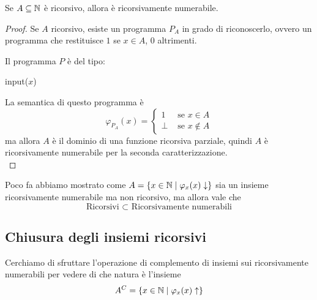 \begin{theor}
	Se $A \subseteq \mathbb{N}$ è ricorsivo, allora è ricorsivamente numerabile.
\end{theor}
\begin{proof}
	Se $A$ ricorsivo, esiste un programma $P_{A}$ in grado di riconoscerlo, ovvero un programma che restituisce $1$ se $x \in A$, $0$ altrimenti.

	Il programma $P$ è del tipo:
	\begin{center}
		\begin{minipage}{.4\textwidth}
			\begin{tcolorbox}[
				colback=white,
				sharp corners,
				boxrule=.3mm,
				left=20pt,
				top=0pt,
				bottom=0pt,
				title=$P$,
				colbacktitle=white,
				coltitle=black
				]
				\begin{algorithm}[H]
					\SetAlgoNoEnd
					input($x$) \\
					 
				\end{algorithm}
			\end{tcolorbox}
		\end{minipage}
	\end{center}

	La semantica di questo programma è
	$$ \varphi_{P_A} (x) = \begin{cases}
		1 & \text{ se } x \in A\\
		\bot & \text{ se } x \notin A
	\end{cases}$$
	ma allora $A$ è il dominio di una funzione ricorsiva parziale, quindi $A$ è ricorsivamente numerabile per la seconda caratterizzazione.\\
\end{proof}

Poco fa abbiamo mostrato come $A = \left\{x \in \mathbb{N} \mid \varphi_x (x) \downarrow\right\}$ sia un insieme ricorsivamente numerabile ma non ricorsivo, ma allora vale che
$$\text{Ricorsivi } \subset \text{ Ricorsivamente numerabili} $$

\subsection{Chiusura degli insiemi ricorsivi}

Cerchiamo di sfruttare l'operazione di complemento di insiemi sui ricorsivamente numerabili per vedere di che natura è l'insieme
$$ A^C = \left\{x \in \mathbb{N} \mid \varphi_x (x) \uparrow \right\}$$

